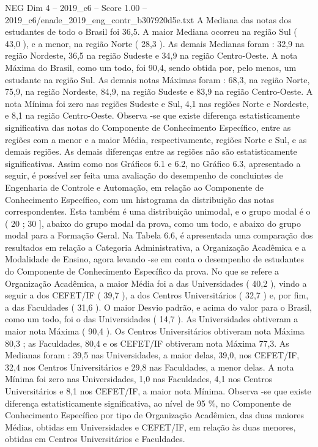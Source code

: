 \begin{textsample}{NEG Dim 4 – 2019\_c6 – Score 1.00 – 2019\_c6/enade\_2019\_eng\_contr\_b307920d5e.txt}
A Mediana das notas dos estudantes de todo o Brasil foi 36,5.
A maior Mediana ocorreu na região Sul ( 43,0 ), e a menor, na região Norte ( 28,3 ).
As demais Medianas foram : 32,9 na região Nordeste, 36,5 na região Sudeste e 34,9 na região Centro-Oeste.
A nota Máxima do Brasil, como um todo, foi 90,4, sendo obtida por, pelo menos, um estudante na região Sul.
As demais notas Máximas foram : 68,3, na região Norte, 75,9, na região Nordeste, 84,9, na região Sudeste e 83,9 na região Centro-Oeste.
A nota Mínima foi zero nas regiões Sudeste e Sul, 4,1 nas regiões Norte e Nordeste, e 8,1 na região Centro-Oeste.
Observa -se que existe diferença estatisticamente significativa das notas do Componente de Conhecimento Específico, entre as regiões com a menor e a maior Média, respectivamente, regiões Norte e Sul, e as demais regiões.
As demais diferenças entre as regiões não são estatisticamente significativas.
Assim como nos Gráficos 6.1 e 6.2, no Gráfico 6.3, apresentado a seguir, é possível ser feita uma avaliação do desempenho de concluintes de Engenharia de Controle e Automação, em relação ao Componente de Conhecimento Específico, com um histograma da distribuição das notas correspondentes.
Esta também é uma distribuição unimodal, e o grupo modal é o ( 20 ; 30 ], abaixo do grupo modal da prova, como um todo, e abaixo do grupo modal para a Formação Geral.
Na Tabela 6.6, é apresentada uma comparação dos resultados em relação a Categoria Administrativa, a Organização Acadêmica e a Modalidade de Ensino, agora levando -se em conta o desempenho de estudantes do Componente de Conhecimento Específico da prova.
No que se refere a Organização Acadêmica, a maior Média foi a das Universidades ( 40,2 ), vindo a seguir a dos CEFET/IF ( 39,7 ), a dos Centros Universitários ( 32,7 ) e, por fim, a das Faculdades ( 31,6 ).
O maior Desvio padrão, e acima do valor para o Brasil, como um todo, foi o das Universidades ( 14,7 ).
As Universidades obtiveram a maior nota Máxima ( 90,4 ).
Os Centros Universitários obtiveram nota Máxima 80,3 ; as Faculdades, 80,4 e os CEFET/IF obtiveram nota Máxima 77,3.
As Medianas foram : 39,5 nas Universidades, a maior delas, 39,0, nos CEFET/IF, 32,4 nos Centros Universitários e 29,8 nas Faculdades, a menor delas.
A nota Mínima foi zero nas Universidades, 1,0 nas Faculdades, 4,1 nos Centros Universitários e 8,1 nos CEFET/IF, a maior nota Mínima.
Observa -se que existe diferença estatisticamente significativa, ao nível de 95 \%, no Componente de Conhecimento Específico por tipo de Organização Acadêmica, das duas maiores Médias, obtidas em Universidades e CEFET/IF, em relação às duas menores, obtidas em Centros Universitários e Faculdades.

\end{textsample}
